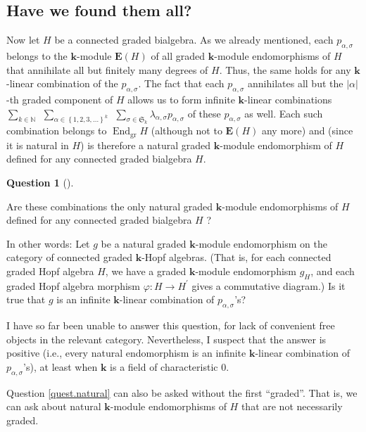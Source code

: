 \documentclass[numbers=enddot,12pt,final,onecolumn,notitlepage]{scrartcl}%
\theoremstyle{definition}
\newtheorem{quest}[theo]{Question}
\newenvironment{question}[1][]
{\begin{quest}[#1]\begin{leftbar}}
{\end{leftbar}\end{quest}}
\newenvironment{question}[1][Question]{\noindent\textbf{#1.} }{\ \rule{0.5em}{0.5em}}
\let\sumnonlimits\sum
\renewcommand{\sum}{\sumnonlimits\limits}
\begin{document}
\subsection{Have we found them all?}

Now let $H$ be a connected graded bialgebra. As we already mentioned, each
$p_{\alpha,\sigma}$ belongs to the $\mathbf{k}$-module $\mathbf{E}\left(
H\right)  $ of all graded $\mathbf{k}$-module endomorphisms of $H$ that
annihilate all but finitely many degrees of $H$. Thus, the same holds for any
$\mathbf{k}$-linear combination of the $p_{\alpha,\sigma}$. The fact that each
$p_{\alpha,\sigma}$ annihilates all but the $\left\vert \alpha\right\vert $-th
graded component of $H$ allows us to form infinite $\mathbf{k}$-linear
combinations $\sum_{k\in\mathbb{N}}\ \ \sum_{\alpha\in\left\{  1,2,3,\ldots
\right\}  ^{k}}\ \ \sum_{\sigma\in\mathfrak{S}_{k}}\lambda_{\alpha,\sigma
}p_{\alpha,\sigma}$ of these $p_{\alpha,\sigma}$ as well. Each such
combination belongs to $\operatorname*{End}\nolimits_{\operatorname*{gr}}H$
(although not to $\mathbf{E}\left(  H\right)  $ any more) and (since it is
natural in $H$) is therefore a natural graded $\mathbf{k}$-module endomorphism
of $H$ defined for any connected graded bialgebra $H$.

\begin{question}
\label{quest.natural}Are these combinations the only natural graded
$\mathbf{k}$-module endomorphisms of $H$ defined for any connected graded
bialgebra $H$ ?

In other words: Let $g$ be a natural graded $\mathbf{k}$-module endomorphism
on the category of connected graded $\mathbf{k}$-Hopf algebras. (That is, for
each connected graded Hopf algebra $H$, we have a graded $\mathbf{k}$-module
endomorphism $g_{H}$, and each graded Hopf algebra morphism $\varphi
:H\rightarrow H^{\prime}$ gives a commutative diagram.) Is it true that $g$ is
an infinite $\mathbf{k}$-linear combination of $p_{\alpha,\sigma}$'s?
\end{question}

I have so far been unable to answer this question, for lack of convenient free
objects in the relevant category. Nevertheless, I suspect that the answer is
positive (i.e., every natural endomorphism is an infinite $\mathbf{k}$-linear
combination of $p_{\alpha,\sigma}$'s), at least when $\mathbf{k}$ is a field
of characteristic $0$.

Question \ref{quest.natural} can also be asked without the first
\textquotedblleft graded\textquotedblright. That is, we can ask about natural
$\mathbf{k}$-module endomorphisms of $H$ that are not necessarily graded.
\end{document}
